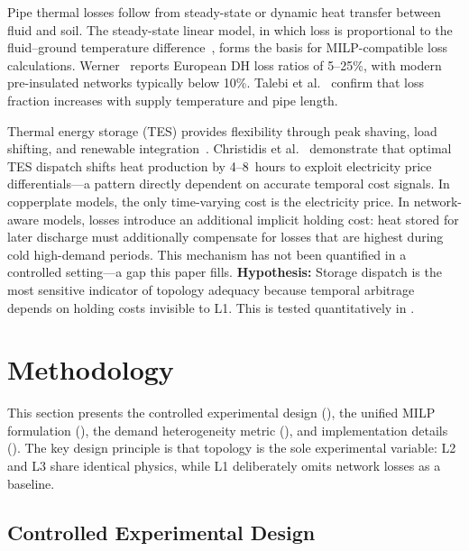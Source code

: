 \documentclass[review,3p]{elsarticle}
\begin{document}
Pipe thermal losses follow from steady-state or dynamic heat transfer
between fluid and soil. The steady-state linear model, in which loss
is proportional to the fluid--ground temperature
difference~\cite{Paalsson1999,Frederiksen2013}, forms the basis for
MILP-compatible loss calculations. Werner~\cite{Werner2017} reports
European DH loss ratios of 5--25\%, with modern pre-insulated networks
typically below 10\%. Talebi et al.~\cite{Talebi2016} confirm that
loss fraction increases with supply temperature and pipe length.

Thermal energy storage (TES) provides flexibility through peak
shaving, load shifting, and renewable
integration~\cite{Vandermeulen2018,Guelpa2019review}. Christidis et
al.~\cite{Christidis2017} demonstrate that optimal TES dispatch
shifts heat production by 4--8~hours to exploit electricity price
differentials---a pattern directly dependent on accurate temporal cost
signals. In copperplate models, the only time-varying cost is the
electricity price. In network-aware models, losses introduce an
additional implicit holding cost: heat stored for later discharge
must additionally compensate for losses that are highest during cold
high-demand periods. This mechanism has not been quantified in a
controlled setting---a gap this paper fills.
\textbf{Hypothesis:} Storage dispatch is the most sensitive 
indicator of topology adequacy because temporal arbitrage 
depends on holding costs invisible to L1. This is tested 
quantitatively in .
\section{Methodology}
\label{sec:methodology}

This section presents the controlled experimental design
(), the unified MILP formulation
(), the demand heterogeneity metric
(), and implementation details
(). The key design principle is that topology
is the sole experimental variable: L2 and L3 share identical physics,
while L1 deliberately omits network losses as a baseline.

\subsection{Controlled Experimental Design}
\label{sec:exp_design}
\end{document}

